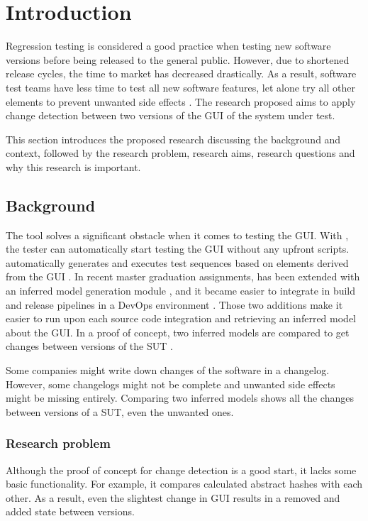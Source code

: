 \chapter{Introduction} \label{introduction}
    
Regression testing is considered a good practice when testing new software versions before being released to the general public. 
However, due to shortened release cycles, the time to market has decreased drastically. As a result, software test teams have less time to test all new software features, let alone try all other elements to prevent unwanted side effects \cite{rapid-release-cycle-issues}.
The research proposed aims to apply change detection between two versions of the GUI of the system under test. 

This section introduces the proposed research discussing the background and context, followed by the research problem, research aims, research questions and why this research is important.

\section{Background}
The \testar tool solves a significant obstacle when it comes to testing the GUI. With \testar, the tester can automatically start testing the GUI without any upfront scripts. \testar automatically generates and executes test sequences based on elements derived from the GUI \cite{VosAho2021}. In recent master graduation assignments, \testar has been extended with an inferred model generation module \cite{thesisMulders}, and it became easier to integrate \testar in build and release pipelines in a DevOps environment \cite{thesisSlomp}. Those two additions make it easier to run \testar upon each source code integration and retrieving an inferred model about the GUI. In a proof of concept, two inferred models are compared to get changes between versions of the SUT \cite{stateDiff}.

Some companies might write down changes of the software in a changelog. However, some changelogs might not be complete and unwanted side effects might be missing entirely. Comparing two inferred models shows all the changes between versions of a SUT, even the unwanted ones.

\subsection{Research problem}
Although the proof of concept for change detection is a good start, it lacks some basic functionality. For example, it compares calculated abstract hashes with each other. As a result, even the slightest change in GUI results in a removed and added state between versions.

